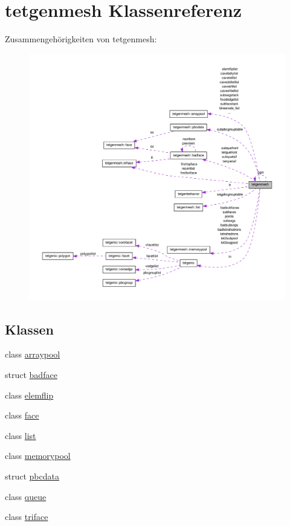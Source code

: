 \hypertarget{classtetgenmesh}{\section{tetgenmesh Klassenreferenz}
\label{classtetgenmesh}
}


Zusammengehörigkeiten von tetgenmesh\-:\nopagebreak
\begin{figure}[H]
\begin{center}
\leavevmode
\includegraphics[width=350pt]{classtetgenmesh__coll__graph}
\end{center}
\end{figure}
\subsection*{Klassen}
\begin{DoxyCompactItemize}
\item 
class \hyperlink{classtetgenmesh_1_1arraypool}{arraypool}
\item 
struct \hyperlink{structtetgenmesh_1_1badface}{badface}
\item 
class \hyperlink{classtetgenmesh_1_1elemflip}{elemflip}
\item 
class \hyperlink{classtetgenmesh_1_1face}{face}
\item 
class \hyperlink{classtetgenmesh_1_1list}{list}
\item 
class \hyperlink{classtetgenmesh_1_1memorypool}{memorypool}
\item 
struct \hyperlink{structtetgenmesh_1_1pbcdata}{pbcdata}
\item 
class \hyperlink{classtetgenmesh_1_1queue}{queue}
\item 
class \hyperlink{classtetgenmesh_1_1triface}{triface}
\end{DoxyCompactItemize}
